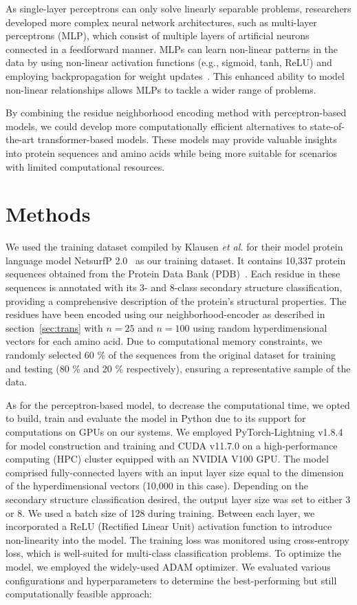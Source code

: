 As single-layer perceptrons can only solve linearly separable problems, researchers developed more complex neural network architectures, such as multi-layer perceptrons (MLP), which consist of multiple layers of artificial neurons connected in a feedforward manner. MLPs can learn non-linear patterns in the data by using non-linear activation functions (e.g., sigmoid, tanh, ReLU) and employing backpropagation for weight updates~\cite{mlp}. This enhanced ability to model non-linear relationships allows MLPs to tackle a wider range of problems.

By combining the residue neighborhood encoding method with perceptron-based models, we could develop more computationally efficient alternatives to state-of-the-art transformer-based models. These models may provide valuable insights into protein sequences and amino acids while being more suitable for scenarios with limited computational resources.

\section{Methods}
We used the training dataset compiled by Klausen \textit{et al.} for their model protein language model NetsurfP 2.0~\cite{netsurf} as our training dataset. It contains 10,337 protein sequences obtained from the Protein Data Bank (PDB)~\cite{pdb}. Each residue in these sequences is annotated with its 3- and 8-class secondary structure classification, providing a comprehensive description of the protein's structural properties. The residues have been encoded using our neighborhood-encoder as described in section~\ref{sec:trans} with $n=25$ and $n=100$ using random hyperdimensional vectors for each amino acid. Due to computational memory constraints, we randomly selected 60 \% of the sequences from the original dataset for training and testing (80 \% and 20 \% respectively), ensuring a representative sample of the data.

As for the perceptron-based model, to decrease the computational time, we opted to build, train and evaluate the model in Python due to its support for computations on GPUs on our systems. We employed PyTorch-Lightning v1.8.4 for model construction and training and CUDA v11.7.0 on a high-performance computing (HPC) cluster equipped with an NVIDIA V100 GPU. The model comprised fully-connected layers with an input layer size equal to the dimension of the hyperdimensional vectors (10,000 in this case). Depending on the secondary structure classification desired, the output layer size was set to either 3 or 8. We used a batch size of 128 during training. Between each layer, we incorporated a ReLU (Rectified Linear Unit) activation function to introduce non-linearity into the model. The training loss was monitored using cross-entropy loss, which is well-suited for multi-class classification problems. To optimize the model, we employed the widely-used ADAM optimizer. We evaluated various configurations and hyperparameters to determine the best-performing but still computationally feasible approach:


